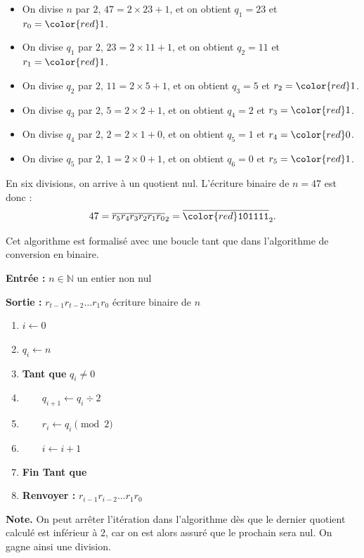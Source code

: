 \documentclass[class=report,crop=false]{standalone}
\begin{document}
\begin{itemize}
\item On divise $n$ par $2$, $47 = 2\times 23 + 1$, et on obtient $q_1=23$ et $r_0={\color{red}1}$.
\item On divise $q_1$ par $2$, $23 = 2\times 11 + 1$, et on obtient $q_2=11$ et $r_1={\color{red}1}$.
\item On divise $q_2$ par $2$, $11 = 2\times 5 + 1$, et on obtient $q_3=5$ et $r_2={\color{red}1}$.
\item On divise $q_3$ par $2$, $5 = 2\times 2 + 1$, et on obtient $q_4=2$ et $r_3={\color{red}1}$.
\item On divise $q_4$ par $2$, $2 = 2\times 1 + 0$, et on obtient $q_5=1$ et $r_4={\color{red}0}$.
\item On divise $q_5$ par $2$, $1 = 2\times 0 + 1$, et on obtient $q_6=0$ et $r_5={\color{red}1}$.
\end{itemize}

En six divisions, on arrive à un quotient nul. L'écriture binaire de $n=47$ est donc :
\[47 = \overline{r_{5}r_{4}r_{3}r_{2}r_{1}r_{0}}_2 = \overline{{\color{red}\mathtt{101111}}}_2.\]

Cet algorithme est formalisé avec une boucle tant que dans
l'algorithme de conversion en binaire.

\begin{algo}

\textbf{Entrée :} $n\in\mathbb{N}$ un entier non nul

\textbf{Sortie :} $r_{t-1}r_{t-2}\ldots r_1r_0$ écriture binaire de $n$


\begin{enumerate}
\item $i \leftarrow 0$
\item $q_i \leftarrow n$
\item \textbf{Tant que} $q_i \neq 0$
\item $\qquad q_{i+1} \leftarrow q_i\div 2$
\item $\qquad r_i \leftarrow q_i \pmod{2}$
\item $\qquad i \leftarrow i + 1$
\item \textbf{Fin Tant que}
\item \textbf{Renvoyer :} $r_{i-1}r_{i-2}\ldots r_1r_0$
\end{enumerate}
\end{algo}



\textbf{Note.}
On peut arrêter l'itération dans l'algorithme dès que le dernier
quotient calculé est inférieur à $2$, car on est alors assuré que le
prochain sera nul. On gagne ainsi une division.
\end{document}
